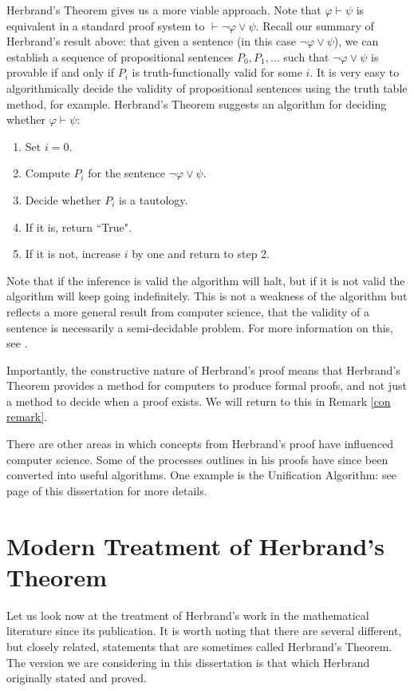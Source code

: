 \documentclass[a4paper,12pt]{report}
\theoremstyle{definition}
\begin{document}
Herbrand's Theorem gives us a more viable approach. Note that $\varphi \vdash \psi$ is equivalent in a standard proof system to $\vdash \neg \varphi \lor \psi$. Recall our summary of Herbrand's result above: that given a sentence (in this case $\neg \varphi \lor \psi$), we can establish a sequence of propositional sentences $P_0 , P_1, \ldots$ such that $\neg \varphi \lor \psi$ is provable if and only if $P_i$ is truth-functionally valid for some $i$. It is very easy to algorithmically decide the validity of propositional sentences using the truth table method, for example. Herbrand's Theorem suggests an algorithm for deciding whether $\varphi \vdash \psi$:

\begin{enumerate}
\item Set $i = 0$.
\item Compute $P_i$ for the sentence $\neg \varphi \lor \psi$.
\item Decide whether $P_i$ is a tautology.
\item If it is, return ``True".
\item If it is not, increase $i$ by one and return to step 2.
\end{enumerate}

Note that if the inference is valid the algorithm will halt, but if it is not valid the algorithm will keep going indefinitely. This is not a weakness of the algorithm but reflects a more general result from computer science, that the validity of a sentence is necessarily a semi-decidable problem. For more information on this, see \cite{kr&r}.

Importantly, the constructive nature of Herbrand's proof means that Herbrand's Theorem provides a method for computers to produce formal proofs, and not just a method to decide when a proof exists. We will return to this in Remark \ref{con remark}.

There are other areas in which concepts from Herbrand's proof have influenced computer science. Some of the processes outlines in his proofs have since been converted into useful algorithms. One example is the Unification Algorithm: see page \pageref{unif} of this dissertation for more details.

\section{Modern Treatment of Herbrand's Theorem}

Let us look now at the treatment of Herbrand's work in the mathematical literature since its publication. It is worth noting that there are several different, but closely related, statements that are sometimes called Herbrand's Theorem. The version we are considering in this dissertation is that which Herbrand originally stated and proved.
\end{document}
